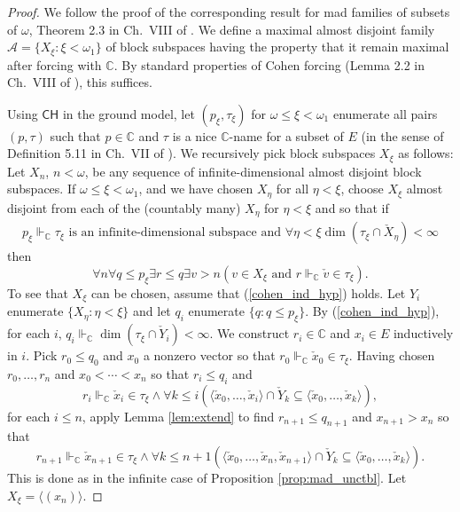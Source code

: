 \documentclass[11pt]{amsart}
\newcommand{\forces}{\mathrel{\Vdash}}
\newcommand{\C}{\mathbb{C}}
\newcommand{\LA}{\mathcal{A}}
\theoremstyle{definition}
\theoremstyle{remark}
\newcommand{\CH}{\mathsf{CH}}
\renewcommand{\1}{\mathbf{1}}
\begin{document}
\begin{proof}
	We follow the proof of the corresponding result for mad families of subsets of $\omega$, Theorem 2.3 in Ch.~VIII of \cite{MR597342}. We define a maximal almost disjoint family $\LA=\{X_\xi:\xi<\omega_1\}$ of block subspaces having the property that it remain maximal after forcing with $\C$. By standard properties of Cohen forcing (Lemma 2.2 in Ch.~VIII of \cite{MR597342}), this suffices.
	
	Using $\CH$ in the ground model, let $(p_\xi,\tau_\xi)$ for $\omega\leq\xi<\omega_1$ enumerate all pairs $(p,\tau)$ such that $p\in\C$ and $\tau$ is a nice $\C$-name for a subset of $E$ (in the sense of Definition 5.11 in Ch.~VII of \cite{MR597342}). We recursively pick block subspaces $X_\xi$ as follows: Let $X_n$, $n<\omega$, be any sequence of infinite-dimensional almost disjoint block subspaces. If $\omega\leq\xi<\omega_1$, and we have chosen $X_\eta$ for all $\eta<\xi$, choose $X_\xi$ almost disjoint from each of the (countably many) $X_\eta$ for $\eta<\xi$ and so that if 
	\begin{align}\label{cohen_ind_hyp}
		p_\xi\forces_\C\text{$\tau_\xi$ is an infinite-dimensional subspace and $\forall\eta<\xi\dim(\tau_\xi\cap \check{X}_\eta)<\infty$}
	\end{align}
	then
	\[
		\forall n\forall q\leq p_\xi\exists r\leq q\exists v>n(v\in X_\xi \text{ and } r\forces_\C\check{v}\in\tau_\xi).
	\]
	To see that $X_\xi$ can be chosen, assume that (\ref{cohen_ind_hyp}) holds. Let $Y_i$ enumerate $\{X_\eta:\eta<\xi\}$ and let $q_i$ enumerate $\{q:q\leq p_\xi\}$. By (\ref{cohen_ind_hyp}), for each $i$, $q_i\forces_\C\dim(\tau_\xi\cap\check{Y}_i)<\infty$. We construct $r_i\in\C$ and $x_i\in E$ inductively in $i$. Pick $r_0\leq q_0$ and $x_0$ a nonzero vector so that $r_0\forces_\C \check{x}_0\in\tau_\xi$. Having chosen $r_0,\ldots,r_n$ and $x_0<\cdots<x_n$ so that $r_i\leq q_i$ and 
	\[
		r_i\forces_\C \check{x}_i\in\tau_\xi \land \forall k\leq i(\langle \check{x}_0,\ldots,\check{x}_i\rangle\cap \check{Y}_k\subseteq\langle\check{x}_0,\ldots,\check{x}_{k}\rangle),
	\]
	for each $i\leq n$, apply Lemma \ref{lem:extend} to find $r_{n+1}\leq q_{n+1}$ and $x_{n+1}>x_n$ so that 
	\[
		r_{n+1}\forces_\C \check{x}_{n+1}\in\tau_\xi \land \forall k\leq n+1(\langle \check{x}_0,\ldots,\check{x}_n,\check{x}_{n+1}\rangle\cap \check{Y}_k\subseteq\langle \check{x}_0,\ldots,\check{x}_{k}\rangle).
	\]
	This is done as in the infinite case of Proposition \ref{prop:mad_unctbl}. Let $X_\xi=\langle(x_n)\rangle$.
	

\end{proof}
\end{document}
